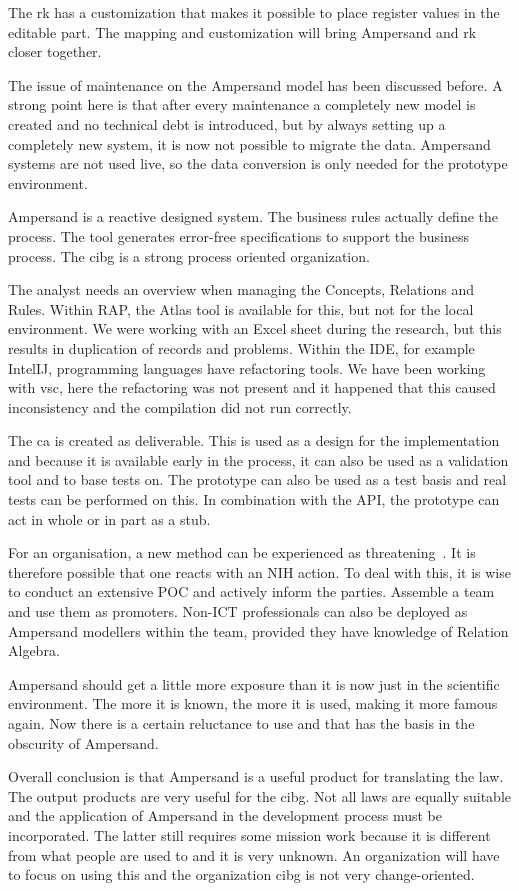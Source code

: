 The \acrshort{rk} has a customization that makes it possible to place register values in the editable part.
The mapping and customization will bring Ampersand and \acrshort{rk} closer together.

The issue of maintenance on the Ampersand model has been discussed before.
A strong point here is that after every maintenance a completely new model is created and no technical debt is introduced, but by always setting up a completely new system, it is now not possible to migrate the data.
Ampersand systems are not used live, so the data conversion is only needed for the prototype environment.

Ampersand is a reactive designed system.
The business rules actually define the process.
The tool generates error-free specifications to support the business process.
The \acrshort{cibg} is a strong process oriented organization.

The analyst needs an overview when managing the Concepts, Relations and Rules.
Within RAP, the Atlas tool is available for this, but not for the local environment.
We were working with an Excel sheet during the research, but this results in duplication of records and problems.
Within the IDE, for example IntelIJ, programming languages have refactoring tools.
We have been working with \acrshort{vsc}, here the refactoring was not present and it happened that this caused inconsistency and the compilation did not run correctly.

The \acrlong{ca} is created as deliverable.
This is used as a design for the implementation and because it is available early in the process, it can also be used as a validation tool and to base tests on.
The prototype can also be used as a test basis and real tests can be performed on this.
In combination with the API, the prototype can act in whole or in part as a stub.

For an organisation, a new method can be experienced as threatening~\citep{antons_assessing_2017}.
It is therefore possible that one reacts with an NIH action.
To deal with this, it is wise to conduct an extensive POC and actively inform the parties.
Assemble a team and use them as promoters.
Non-ICT professionals can also be deployed as Ampersand modellers within the team, provided they have knowledge of Relation Algebra.

Ampersand should get a little more exposure than it is now just in the scientific environment.
The more it is known, the more it is used, making it more famous again.
Now there is a certain reluctance to use and that has the basis in the obscurity of Ampersand.

Overall conclusion is that Ampersand is a useful product for translating the law.
The output products are very useful for the \acrshort{cibg}.
Not all laws are equally suitable and the application of Ampersand in the development process must be incorporated.
The latter still requires some mission work because it is different from what people are used to and it is very unknown.
An organization will have to focus on using this and the organization \acrshort{cibg} is not very change-oriented.